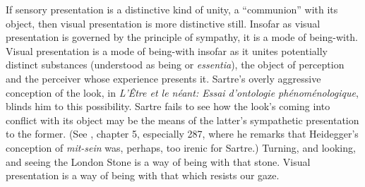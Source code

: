 \documentclass[12pt]{article}
\begin{document}
If sensory presentation is a distinctive kind of unity, a ``communion'' with its object, then visual presentation is more distinctive still. Insofar as visual presentation is governed by the principle of sympathy, it is a mode of being-with. Visual presentation is a mode of being-with insofar as it unites potentially distinct substances (understood as being or \emph{essentia}), the object of perception and the perceiver whose experience presents it. Sartre’s overly aggressive conception of the look, in \emph{L’Être et le néant: Essai d’ontologie phénoménologique}, blinds him to this possibility. Sartre fails to see how the look’s coming into conflict with its object may be the means of the latter’s sympathetic presentation to the former. (See \citealt{Jay:1994aa}, chapter 5, especially 287, where he remarks that Heidegger’s conception of \emph{mit-sein} was, perhaps, too irenic for Sartre.) Turning, and looking, and seeing the London Stone is a way of being with that stone. Visual presentation is a way of being with that which resists our gaze.



\nocite{Broadie:1993dz}
\nocite{Hicks:1907uq}



\end{document}

